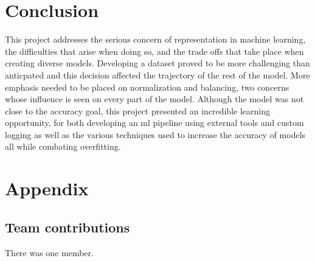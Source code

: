 \section{Conclusion}
This project addresses the serious concern of representation in machine learning, the difficulties that arise when doing so, and the trade offs that 
take place when creating diverse models. Developing a dataset proved to be more challenging than anticpated and this decision affected the trajectory of 
the rest of the model. More emphasis needed to be placed on normalization and balancing, two concerns whose influence is seen on every part of the model. 
Although the model was not close to the accuracy goal, this project presented an incredible learning opportunity, for both developing an ml pipeline using external 
tools and custom logging as well as the various techniques used to increase the accuracy of models all while combating overfitting.


{\small


}

\section*{Appendix}

\subsection*{Team contributions}

There was one member.


